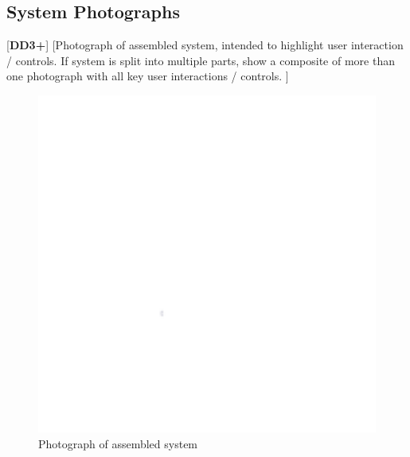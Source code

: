 \subsection{System Photographs} %
[\textbf{DD3+}]
[Photograph of assembled system, intended to highlight user interaction / controls. If system is split into multiple parts, show a composite of more than one photograph with all key user interactions / controls. ]
\begin{figure}[h]
    \centering
    \includegraphics[width=16cm]{images/white.png} %
    \caption{Photograph of assembled system}
\end{figure}